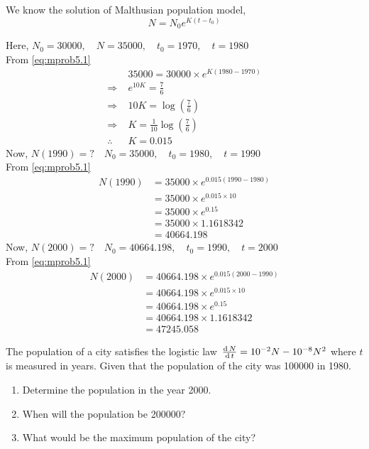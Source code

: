 \documentclass[../main-sheet.tex]{subfiles}
\begin{document}
\begin{soln}
    We know the solution of Malthusian population model,    
    \begin{equation}
        N=N_0e^{K(t-t_0)}\label{eq:mprob5.1}
    \end{equation}
    
    Here, \(N_0=30000,\quad N=35000,\quad t_0=1970,\quad t=1980\)\\
    From \eqref{eq:mprob5.1}
    \begin{align*}
        &35000=30000 \times e^{K(1980-1970)}\\
        \Rightarrow\;&e^{10K}=\frac{7}{6}\\
        \Rightarrow\;&{10K}=\log\left(\frac{7}{6}\right)\\
        \Rightarrow\;&{K}=\frac{1}{10}\log\left(\frac{7}{6}\right)\\
        \therefore\;&{K}=0.015
    \end{align*}
    Now, \(N(1990)=?\quad N_0=35000,\quad t_0=1980,\quad t=1990\)\\
    From \eqref{eq:mprob5.1}
    \begin{align*}
        N(1990)&=35000\times e^{0.015(1990-1980)}\\
        &=35000\times e^{0.015\times 10}\\
        &=35000\times e^{0.15}\\
        &=35000\times 1.1618342\\
        &=40664.198
    \end{align*}
    Now, \(N(2000)=?\quad N_0=40664.198,\quad t_0=1990,\quad t=2000\)\\
    From \eqref{eq:mprob5.1}
    \begin{align*}
        N(2000)&=40664.198\times e^{0.015(2000-1990)}\\
        &=40664.198\times e^{0.015\times 10}\\
        &=40664.198\times e^{0.15}\\
        &=40664.198\times 1.1618342\\
        &=47245.058
    \end{align*}
\end{soln}
\begin{prob}
    The population of a city satisfies the logistic law \(\,\frac{\mathrm{d}\,N}{\mathrm{d}\,t}=10^{-2}N-10^{-8}N^2\) where \(t\) is measured in years. Given that the population of the city was 100000 in 1980.
    \begin{enumerate}[label=(\alph*)]
        \item Determine the population in the year 2000.
        \item When will the population be 200000?
        \item What would be the maximum population of the city?
    \end{enumerate}
\end{prob}
\end{document}
